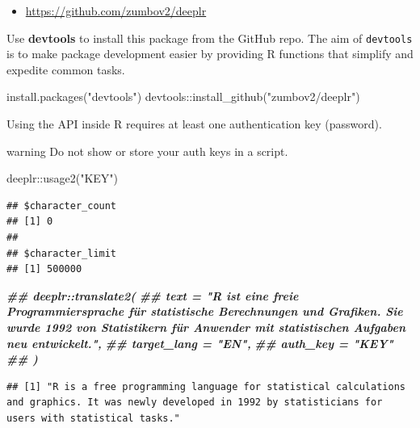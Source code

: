 \documentclass[
]{book}
\newenvironment{Shaded}{\begin{snugshade}}{\end{snugshade}}
\newcommand{\DocumentationTok}[1]{\textcolor[rgb]{0.56,0.35,0.01}{\textbf{\textit{#1}}}}
\newcommand{\FunctionTok}[1]{\textcolor[rgb]{0.00,0.00,0.00}{#1}}
\newcommand{\NormalTok}[1]{#1}
\newcommand{\SpecialCharTok}[1]{\textcolor[rgb]{0.00,0.00,0.00}{#1}}
\newcommand{\StringTok}[1]{\textcolor[rgb]{0.31,0.60,0.02}{#1}}
\providecommand{\tightlist}{%
  \setlength{\itemsep}{0pt}\setlength{\parskip}{0pt}}
\begin{document}
\begin{itemize}
\tightlist
\item
  \url{https://github.com/zumbov2/deeplr}
\end{itemize}

Use \textbf{devtools} to install this package from the GitHub repo. The aim of \texttt{devtools} is to make package development easier by providing R functions that simplify and expedite common tasks.

\begin{Shaded}
\begin{Highlighting}[]
\FunctionTok{install.packages}\NormalTok{(}\StringTok{"devtools"}\NormalTok{)}
\NormalTok{devtools}\SpecialCharTok{::}\FunctionTok{install\_github}\NormalTok{(}\StringTok{"zumbov2/deeplr"}\NormalTok{)}
\end{Highlighting}
\end{Shaded}

Using the API inside R requires at least one authentication key (password).

\begin{infobox2}warning
Do not show or store your auth keys in a script.

\end{infobox2}

\begin{Shaded}
\begin{Highlighting}[]
\NormalTok{deeplr}\SpecialCharTok{::}\FunctionTok{usage2}\NormalTok{(}\StringTok{"KEY"}\NormalTok{)}
\end{Highlighting}
\end{Shaded}

\begin{verbatim}
## $character_count
## [1] 0
## 
## $character_limit
## [1] 500000
\end{verbatim}

\begin{Shaded}
\begin{Highlighting}[]
\DocumentationTok{\#\# deeplr::translate2(}
\DocumentationTok{\#\#   text = "R ist eine freie Programmiersprache für statistische Berechnungen und Grafiken. Sie wurde 1992 von Statistikern für Anwender mit statistischen Aufgaben neu entwickelt.",}
\DocumentationTok{\#\#   target\_lang = "EN",}
\DocumentationTok{\#\#   auth\_key = "KEY"}
\DocumentationTok{\#\#   )}
\end{Highlighting}
\end{Shaded}

\begin{verbatim}
## [1] "R is a free programming language for statistical calculations and graphics. It was newly developed in 1992 by statisticians for users with statistical tasks."
\end{verbatim}
\end{document}
